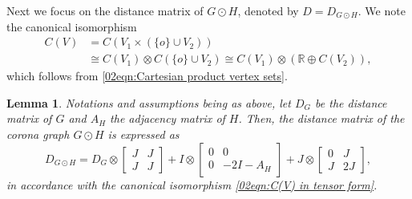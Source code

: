 \documentclass[12pt,a4paper]{article}
\newtheorem{lemma}[theorem]{Lemma}
\newcommand{\1}{{\bm 1}}
\numberwithin{equation}{section}
\begin{document}
Next we focus on the distance matrix of $G\odot H$,
denoted by $D=D_{G\odot H}$.
We note the canonical isomorphism
%
\begin{align}
C(V)
&=C(V_1\times (\{o\}\cup V_2))
\nonumber \\
&\cong C(V_1)\otimes C(\{o\}\cup V_2) 
\cong C(V_1)\otimes (\mathbb{R}\oplus C(V_2)),
\label{02eqn:C(V) in tensor form}
\end{align}
%
which follows from \eqref{02eqn:Cartesian product vertex sets}.

\begin{lemma}\label{01lem:distance matrix in tensor form}
Notations and assumptions being as above,
let $D_G$ be the distance matrix of $G$ and 
$A_H$ the adjacency matrix of $H$.
Then, the distance matrix of the corona graph $G\odot H$ is
expressed as 
%
\begin{equation}\label{02eqn:distance matrix in tensor form}
D_{G\odot H}
=D_G\otimes \begin{bmatrix} J & J \\ J & J \end{bmatrix}
 +I \otimes \begin{bmatrix} 0 & 0 \\ 0 & -2I-A_H \end{bmatrix}
 +J \otimes \begin{bmatrix} 0 & J \\ J & 2J \end{bmatrix},
\end{equation}
in accordance with the canonical isomorphism 
\eqref{02eqn:C(V) in tensor form}.
\end{lemma}
\end{document}
